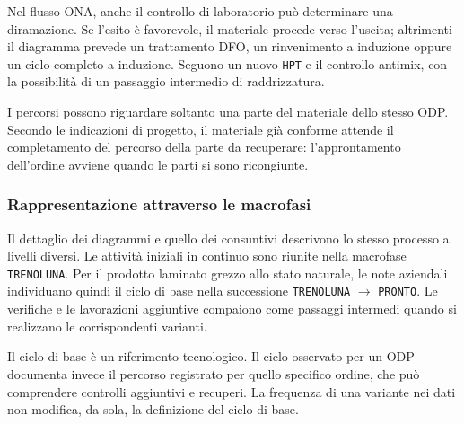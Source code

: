 Nel flusso ONA, anche il controllo di laboratorio può determinare una diramazione. Se l'esito è favorevole, il materiale procede verso l'uscita; altrimenti il diagramma prevede un trattamento DFO, un rinvenimento a induzione oppure un ciclo completo a induzione. Seguono un nuovo \texttt{HPT} e il controllo antimix, con la possibilità di un passaggio intermedio di raddrizzatura.

I percorsi possono riguardare soltanto una parte del materiale dello stesso ODP. Secondo le indicazioni di progetto, il materiale già conforme attende il completamento del percorso della parte da recuperare: l'approntamento dell'ordine avviene quando le parti si sono ricongiunte.

\subsubsection{Rappresentazione attraverso le macrofasi}

Il dettaglio dei diagrammi e quello dei consuntivi descrivono lo stesso processo a livelli diversi. Le attività iniziali in continuo sono riunite nella macrofase \texttt{TRENOLUNA}. Per il prodotto laminato grezzo allo stato naturale, le note aziendali individuano quindi il ciclo di base nella successione \texttt{TRENOLUNA} $\rightarrow$ \texttt{PRONTO}. Le verifiche e le lavorazioni aggiuntive compaiono come passaggi intermedi quando si realizzano le corrispondenti varianti.

Il ciclo di base è un riferimento tecnologico. Il ciclo osservato per un ODP documenta invece il percorso registrato per quello specifico ordine, che può comprendere controlli aggiuntivi e recuperi. La frequenza di una variante nei dati non modifica, da sola, la definizione del ciclo di base.

